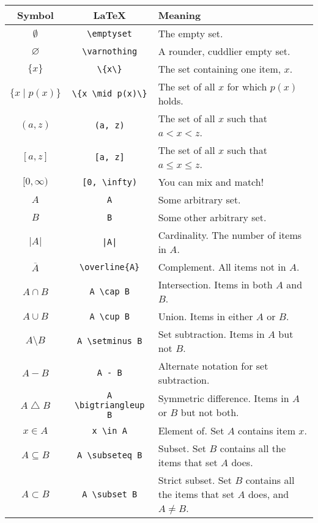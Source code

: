 \documentclass{article}
\begin{document}
\renewcommand{\arraystretch}{1.2}
\begin{tabularx}{\textwidth}{ccX}
    Symbol & \LaTeX & Meaning \\
    \hline
    $\emptyset$ & \texttt{{\textbackslash}emptyset} & The empty set. \\
    $\varnothing$ & \texttt{{\textbackslash}varnothing} & A rounder, cuddlier empty set. \\
    $\{x\}$ & \texttt{{\textbackslash}\{x{\textbackslash}\}} & The set containing one item, $x$. \\
    $\{x \mid p(x)\}$ & \texttt{{\textbackslash}\{x {\textbackslash}mid p(x){\textbackslash}\}} & The set of all $x$ for which $p(x)$ holds. \\
    $(a, z)$ & \texttt{(a, z)} & The set of all $x$ such that $a < x < z$. \\
    $[a, z]$ & \texttt{[a, z]} & The set of all $x$ such that $a \leq x \leq z$. \\
    $[0, \infty)$ & \texttt{[0, {\textbackslash}infty)} & You can mix and match! \\
    $A$ & \texttt{A} & Some arbitrary set. \\
    $B$ & \texttt{B} & Some other arbitrary set. \\
    $|A|$ & \texttt{|A|} & Cardinality. The number of items in $A$. \\
    $\overline{A}$ & \texttt{{\textbackslash}overline\{A\}} & Complement. All items not in $A$. \\
    $A \cap B$ & \texttt{A {\textbackslash}cap B} & Intersection. Items in both $A$ and $B$. \\
    $A \cup B$ & \texttt{A {\textbackslash}cup B} & Union. Items in either $A$ or $B$. \\
    $A \setminus B$ & \texttt{A {\textbackslash}setminus B} & Set subtraction. Items in $A$ but not $B$. \\
    $A - B$ & \texttt{A - B} & Alternate notation for set subtraction. \\
    $A \bigtriangleup B$ & \texttt{A {\textbackslash}bigtriangleup B} & Symmetric difference. Items in $A$ or $B$ but not both. \\
    $x \in A$ & \texttt{x {\textbackslash}in A} & Element of. Set $A$ contains item $x$. \\
    $A \subseteq B$ & \texttt{A {\textbackslash}subseteq B} & Subset. Set $B$ contains all the items that set $A$ does. \\
    $A \subset B$ & \texttt{A {\textbackslash}subset B} & Strict subset. Set $B$ contains all the items that set $A$ does, and $A \neq B$. \\

\end{tabularx}
\end{document}
